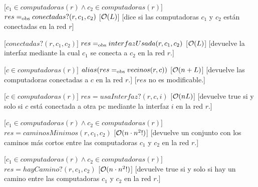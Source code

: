 \begin{Interfaz}
  [$c_1 \in computadoras(r) \land c_2 \in computadoras(r)$]
  {$res =_{\mathrm{obs}} conectadas?(r,c_1,c_2)$}
  [$\mathcal{O}(L)$]
  [dice si las computadoras $c_1$ y $c_2$ están conectadas en la red $r$]


  [$conectadas?(r,c_1,c_2)$]
  {$res =_{\mathrm{obs}} interfazUsada(r,c_1,c_2)$}
  [$\mathcal{O}(L)$]
  [devuelve la interfaz mediante la cual $c_1$ se conecta a $c_2$  en la red $r$.]


  [$c \in computadoras(r)$]
  {$alias(res =_{\mathrm{obs}} vecinos(r,c))$}
  [$\mathcal{O}(n+L)$]
  [devuelve las computadoras conectadas a $c$ en la red $r$.]
  [$res$ no es modificable.]


  [$c \in computadoras(r)$]
  {$res = usaInterfaz?(r,c,i)$}
  [$\mathcal{O}(nL)$]
  [devuelve true si y solo si $c$ está conectada a otra pc mediante la interfaz $i$ en la red $r$.]


  [$c_1 \in computadoras(r) \land c_2 \in computadoras(r)$]
  {$res = caminosMinimos(r,c_1,c_2)$}
  [$\mathcal{O}(n \cdot n^2!)$]
  [devuelve un conjunto con los caminos más cortos entre las computadoras $c_1$ y $c_2$ en la red $r$.]


  [$c_1 \in computadoras(r) \land c_2 \in computadoras(r)$]
  {$res = hayCamino?(r,c_1,c_2)$} 
  [$\mathcal{O}(n \cdot n^2!)$]
  [devuelve true si y solo si hay un camino entre las computadoras $c_1$ y $c_2$ en la red $r$.]



\end{Interfaz}

